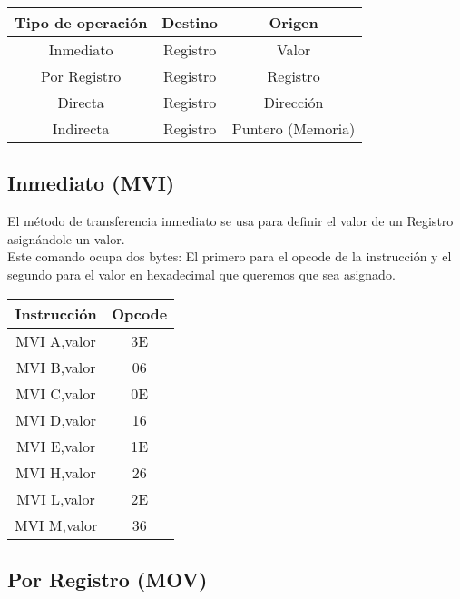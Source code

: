\documentclass[12pt]{article}
\begin{document}
	\begin{table}[h!]
		
		\centering
		
		\label{tab:MODOS}
		
		\begin{tabular}{c|cc}
			\toprule
			Tipo de operación & Destino & Origen     \\
			\midrule
			Inmediato & Registro & Valor               \\
			Por Registro & Registro & Registro       \\
			Directa & Registro & Dirección         \\
			Indirecta & Registro & Puntero (Memoria) \\			
			\bottomrule
		\end{tabular}
		
	\end{table}
	
	\subsection{Inmediato (MVI)}
	
	El método de transferencia inmediato se usa para definir el valor de un Registro asignándole un valor.\\
	
	Este comando ocupa dos bytes: El primero para el opcode de la instrucción y el segundo para el valor en hexadecimal que queremos que sea asignado.
	
		\begin{table}[h!]
		\centering
		\label{tab:MOV3}
		\begin{tabular}{c|c}
			Instrucción & Opcode \\
			\midrule
			MVI A,valor & 3E \\
			MVI B,valor & 06 \\
			MVI C,valor & 0E \\
			MVI D,valor & 16 \\
			MVI E,valor & 1E \\
			MVI H,valor & 26 \\
			MVI L,valor & 2E \\
			MVI M,valor & 36 \\
		\end{tabular}
	\end{table}
	
	\subsection{Por Registro (MOV)}
	
\end{document}
